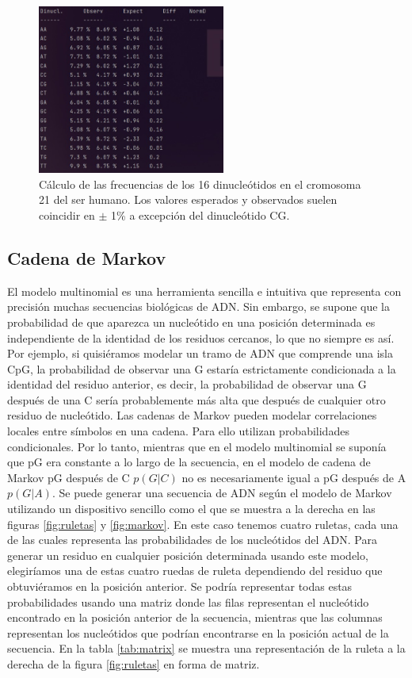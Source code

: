 \begin{figure}[htbp]
\centering
\includegraphics[width = 0.55\textwidth]{figs/freqs-dinucleotidos.jpg}
\caption{Cálculo de las frecuencias de los 16 dinucleótidos en el cromosoma 21 del ser humano. Los valores esperados y observados suelen coincidir en $\pm$ 1\% a excepción del dinucleótido CG. }
\label{fig:dinucleotidos}
\end{figure}
 
\subsection{Cadena de Markov}
El modelo multinomial es una herramienta sencilla e intuitiva que representa con precisión muchas secuencias biológicas de ADN. Sin embargo, se supone que la probabilidad de que aparezca un nucleótido en una posición determinada es independiente de la identidad de los residuos cercanos, lo que no siempre es así. Por ejemplo, si quisiéramos modelar un tramo de ADN que comprende una isla CpG, la probabilidad de observar una G estaría estrictamente condicionada a la identidad del residuo anterior, es decir, la probabilidad de observar una G después de una C sería probablemente más alta que después de cualquier otro residuo de nucleótido. Las cadenas de Markov pueden modelar correlaciones locales entre símbolos en una cadena. Para ello utilizan probabilidades condicionales. Por lo tanto, mientras que en el modelo multinomial se suponía que pG era constante a lo largo de la secuencia, en el modelo de cadena de Markov pG después de C $p(G|C)$ no es necesariamente igual a pG después de A $p(G|A)$.
Se puede generar una secuencia de ADN según el modelo de Markov utilizando un dispositivo sencillo como el que se muestra a la derecha en las figuras \ref{fig:ruletas} y \ref{fig:markov}. En este caso tenemos cuatro ruletas, cada una de las cuales representa las probabilidades de los nucleótidos del ADN. Para generar un residuo en cualquier posición determinada usando este modelo, elegiríamos una de estas cuatro ruedas de ruleta dependiendo del residuo que obtuviéramos en la posición anterior. Se podría representar todas estas probabilidades usando una matriz donde las filas representan el nucleótido encontrado en la posición anterior de la secuencia, mientras que las columnas representan los nucleótidos que podrían encontrarse en la posición actual de la secuencia. En la tabla \ref{tab:matrix} se muestra una representación de la ruleta a la derecha de la figura \ref{fig:ruletas} en forma de matriz.


